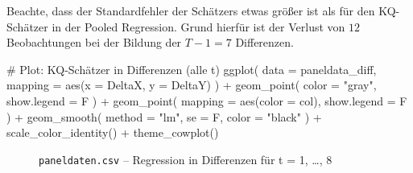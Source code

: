 \documentclass[
  a4paper,
  DIV=11,
  oneside]{scrreprt}
\newenvironment{Shaded}{\begin{snugshade}}{\end{snugshade}}
\newcommand{\AttributeTok}[1]{\textcolor[rgb]{0.40,0.45,0.13}{#1}}
\newcommand{\CommentTok}[1]{\textcolor[rgb]{0.37,0.37,0.37}{#1}}
\newcommand{\FunctionTok}[1]{\textcolor[rgb]{0.28,0.35,0.67}{#1}}
\newcommand{\NormalTok}[1]{\textcolor[rgb]{0.00,0.23,0.31}{#1}}
\newcommand{\SpecialCharTok}[1]{\textcolor[rgb]{0.37,0.37,0.37}{#1}}
\newcommand{\StringTok}[1]{\textcolor[rgb]{0.13,0.47,0.30}{#1}}
\begin{document}
Beachte, dass der Standardfehler der Schätzers etwas größer ist als für
den KQ-Schätzer in der Pooled Regression. Grund hierfür ist der Verlust
von \(12\) Beobachtungen bei der Bildung der \(T-1 = 7\) Differenzen.

\begin{Shaded}
\begin{Highlighting}[]
\CommentTok{\# Plot: KQ{-}Schätzer in Differenzen (alle t)}
\FunctionTok{ggplot}\NormalTok{(}
  \AttributeTok{data =}\NormalTok{ paneldata\_diff,}
  \AttributeTok{mapping =} \FunctionTok{aes}\NormalTok{(}\AttributeTok{x =}\NormalTok{ DeltaX, }\AttributeTok{y =}\NormalTok{ DeltaY)}
\NormalTok{) }\SpecialCharTok{+} 
  \FunctionTok{geom\_point}\NormalTok{(}
    \AttributeTok{color =} \StringTok{"gray"}\NormalTok{,}
    \AttributeTok{show.legend =}\NormalTok{ F}
\NormalTok{  ) }\SpecialCharTok{+}
  \FunctionTok{geom\_point}\NormalTok{(}
    \AttributeTok{mapping =} \FunctionTok{aes}\NormalTok{(}\AttributeTok{color =}\NormalTok{ col),}
    \AttributeTok{show.legend =}\NormalTok{ F}
\NormalTok{  ) }\SpecialCharTok{+}
  \FunctionTok{geom\_smooth}\NormalTok{(}
    \AttributeTok{method =} \StringTok{"lm"}\NormalTok{, }
    \AttributeTok{se =}\NormalTok{ F,}
    \AttributeTok{color =} \StringTok{"black"}
\NormalTok{  ) }\SpecialCharTok{+} 
  \FunctionTok{scale\_color\_identity}\NormalTok{() }\SpecialCharTok{+}
  \FunctionTok{theme\_cowplot}\NormalTok{()}
\end{Highlighting}
\end{Shaded}

\begin{figure}[t]


\caption{\label{fig-diffregression2}\texttt{paneldaten.csv} --
Regression in Differenzen für t = 1, \ldots, 8}

\end{figure}%
\end{document}
